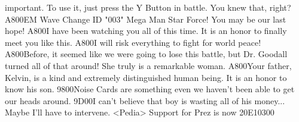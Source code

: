 important. To use it, just press the Y Button in battle. You knew that, right? 
{A8}{00}EM Wave Change ID "003" Mega Man Star Force! You may be our last hope! 
{A8}{00}I have been watching you all of this time. 
It is an honor to finally meet you like this. 
{A8}{00}I will risk everything to fight for world peace! 
{A8}{00}Before, it seemed like we were going to lose this battle, but Dr. Goodall 
turned all of that around! She truly is a remarkable woman. 
{A8}{00}Your father, Kelvin, is a kind and extremely distinguished human being. 
It is an honor to know his son. 
{98}{00}Noise Cards are something even we haven't been able to get our heads around. 
{9D}{00}I can't believe that boy is wasting all of his money... Maybe I'll have to intervene. 
<Pedia> Support for Prez is now {20}{E1}{03}{00}%
